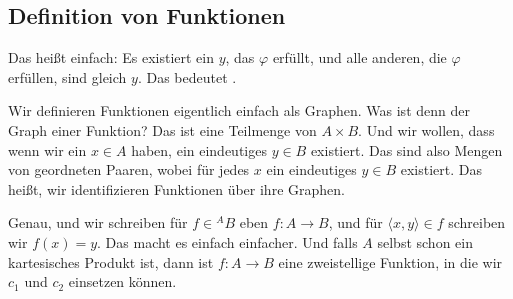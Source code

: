 \subsection{Definition von Funktionen}
\begin{math-stroke}

\end{math-stroke}

\begin{spoken-clean}[01:02:05 - 01:02:54]
Das heißt einfach: Es existiert ein $y$, das $\varphi$ erfüllt, und alle anderen, die $\varphi$ erfüllen, sind gleich $y$. Das bedeutet .

Wir definieren Funktionen eigentlich einfach als Graphen. Was ist denn der Graph einer Funktion? Das ist eine Teilmenge von $A \times B$. Und wir wollen, dass wenn wir ein $x \in A$ haben, ein eindeutiges $y \in B$ existiert. Das sind also Mengen von geordneten Paaren, wobei für jedes $x$ ein eindeutiges $y \in B$ existiert. Das heißt, wir identifizieren Funktionen über ihre Graphen.
\end{spoken-clean}

\begin{spoken-clean}[01:02:54 - 01:04:01]
Genau, und wir schreiben für $f \in {}^A B$ eben $f \colon A \to B$, und für $\langle x, y \rangle \in f$ schreiben wir $f(x) = y$. Das macht es einfach einfacher. Und falls $A$ selbst schon ein kartesisches Produkt ist, dann ist $f \colon A \to B$ eine zweistellige Funktion, in die wir $c_1$ und $c_2$ einsetzen können.
\end{spoken-clean}


